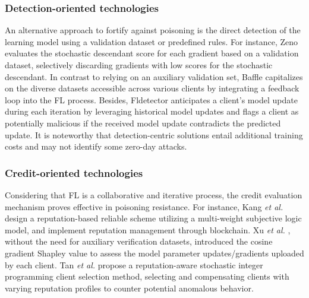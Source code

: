 \documentclass[lettersize,journal]{IEEEtran}
\begin{document}
\subsubsection{Detection-oriented technologies} 
An alternative approach to fortify against poisoning is the direct detection of the learning model using a validation dataset or predefined rules. For instance, Zeno \cite{xie2019zeno} evaluates the stochastic descendant score for each gradient based on a validation dataset, selectively discarding gradients with low scores for the stochastic descendant. In contrast to relying on an auxiliary validation set, Baffle \cite{andreina2021baffle} capitalizes on the diverse datasets accessible across various clients by integrating a feedback loop into the FL process. Besides, Fldetector \cite{zhang2022fldetector} anticipates a client's model update during each iteration by leveraging historical model updates and flags a client as potentially malicious if the received model update contradicts the predicted update. 
It is noteworthy that detection-centric solutions entail additional training costs and may not identify some zero-day attacks.



\subsubsection{Credit-oriented technologies} 
Considering that FL is a collaborative and iterative process, the credit evaluation mechanism proves effective in poisoning resistance. For instance, Kang \textit{et al.} \cite{credit1-kang2019IOT} design a reputation-based reliable scheme utilizing a multi-weight subjective logic model, and implement reputation management through blockchain. Xu \textit{et al.} \cite{xu2020reputation, xu2021gradient}, without the need for auxiliary verification datasets, introduced the cosine gradient Shapley value to assess the model parameter updates/gradients uploaded by each client. Tan \textit{et al.} \cite{tan2022reputation} propose a reputation-aware stochastic integer programming client selection method, selecting and compensating clients with varying reputation profiles to counter potential anomalous behavior.
\end{document}
